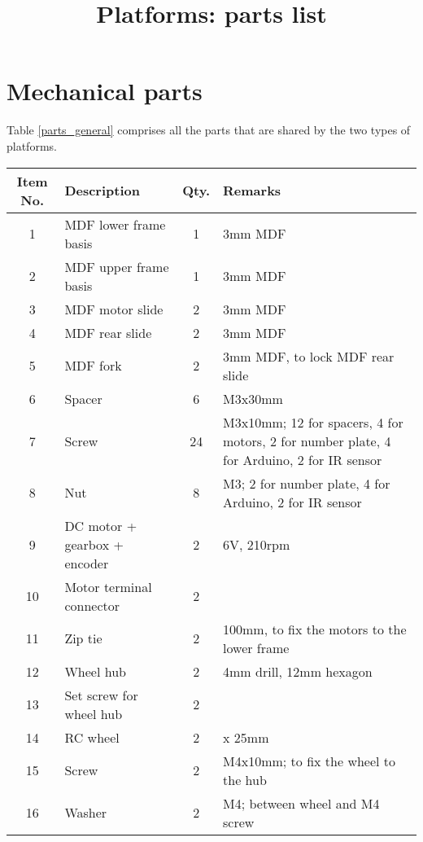 \documentclass[10pt,a4paper]{article}
\title{\textbf{Platforms: parts list}}
\date{\vspace{-5ex}}
\begin{document}
\maketitle
\vspace*{-3em}
\section{Mechanical parts}
Table \ref{parts_general} comprises all the parts that are shared by the two types of platforms.
\begin{table}[h]
	\centering
	\begin{tabular}{| c | l | c | l|}
		\hline
		Item No. & Description & Qty. & Remarks \\ \hline
		1 & MDF lower frame basis & 1 & \footnotesize 3mm MDF\\ \hline
		2 & MDF upper frame basis & 1 & \footnotesize 3mm MDF\\ \hline
		3 & MDF motor slide & 2 & \footnotesize 3mm MDF\\ \hline
		4 & MDF rear slide & 2 & \footnotesize 3mm MDF\\ \hline
		5 & MDF fork & 2 & \footnotesize 3mm MDF, to lock MDF rear slide\\ \hline
		6 & Spacer & 6 & \footnotesize M3x30mm\\ \hline
		7 & Screw & 24 & \begin{minipage}{6cm}
			\footnotesize M3x10mm; 12 for spacers, 4 for motors, 2 for number plate, 4 for Arduino, 2 for IR sensor
		\end{minipage}\\ \hline
		8 & Nut & 8 & \footnotesize M3; 2 for number plate, 4 for Arduino, 2 for IR sensor\\ \hline
		9 & DC motor + gearbox + encoder & 2 & \footnotesize 6V, 210rpm\\ \hline
		10 & Motor terminal connector & 2 & \\ \hline
		11 & Zip tie & 2 & \footnotesize 100mm, to fix the motors to the lower frame\\ \hline
		12 & Wheel hub & 2 & \footnotesize 4mm drill, 12mm hexagon\\ \hline
		13 & Set screw for wheel hub & 2 & \\ \hline
		14 & RC wheel & 2 & \footnotesize \diameter 65mm x 25mm \\ \hline
		15 & Screw & 2 & \footnotesize M4x10mm; to fix the wheel to the hub\\ \hline
		16 & Washer & 2 & \footnotesize M4; between wheel and M4 screw\\ \hline

\end{tabular}
\end{table}
\end{document}
